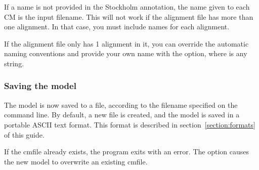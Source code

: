 If a name is not provided in the Stockholm 
annotation, the name given to each CM is the input filename. This will
not work if the alignment file has more than one alignment. In that
case, you must include names for each alignment.

If the alignment file only has 1 alignment in it, you can override the
automatic naming conventions and provide your own name with the 
option, where  is any string. 

\subsubsection{Saving the model}

The model is now saved to a file, according to the filename specified
on the command line. By default, a new file is created, and the model
is saved in a portable ASCII text format. This format is described in
section~\ref{section:formats} of this guide.

If the cmfile already exists, the program exits with an error. The
 option causes the new model to overwrite an existing
cmfile. 


